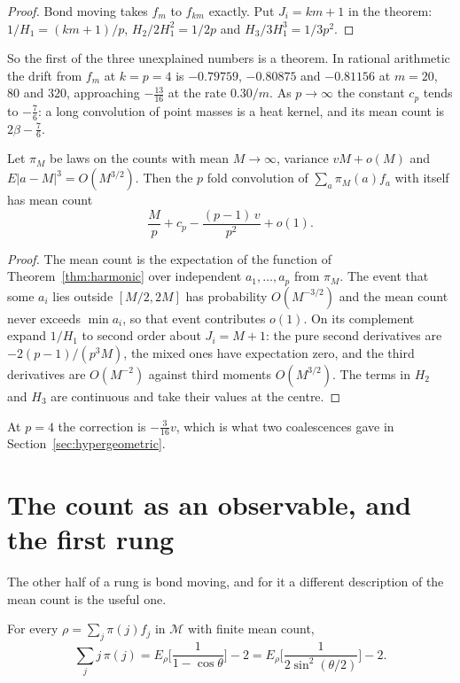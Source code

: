 \begin{proof}
Bond moving takes $f_m$ to $f_{km}$ exactly. Put $J_i=km+1$ in the theorem: $1/H_1=(km+1)/p$, $H_2/2H_1^2=1/2p$ and $H_3/3H_1^3=1/3p^2$.
\end{proof}

So the first of the three unexplained numbers is a theorem. In rational arithmetic the drift from $f_m$ at $k=p=4$ is $-0.79759$, $-0.80875$ and $-0.81156$ at $m=20$, $80$ and $320$, approaching $-\frac{13}{16}$ at the rate $0.30/m$. As $p\to\infty$ the constant $c_p$ tends to $-\frac76$: a long convolution of point masses is a heat kernel, and its mean count is $2\beta-\frac76$.

\begin{corollary}\label{cor:decdrift}
Let $\pi_M$ be laws on the counts with mean $M\to\infty$, variance $vM+o(M)$ and $E|a-M|^3=O(M^{3/2})$. Then the $p$ fold convolution of $\sum_a\pi_M(a)f_a$ with itself has mean count
\[
\frac Mp+c_p-\frac{(p-1)\,v}{p^2}+o(1).
\]
\end{corollary}

\begin{proof}
The mean count is the expectation of the function of Theorem~\ref{thm:harmonic} over independent $a_1,\dots,a_p$ from $\pi_M$. The event that some $a_i$ lies outside $[M/2,2M]$ has probability $O(M^{-3/2})$ and the mean count never exceeds $\min a_i$, so that event contributes $o(1)$. On its complement expand $1/H_1$ to second order about $J_i=M+1$: the pure second derivatives are $-2(p-1)/(p^3M)$, the mixed ones have expectation zero, and the third derivatives are $O(M^{-2})$ against third moments $O(M^{3/2})$. The terms in $H_2$ and $H_3$ are continuous and take their values at the centre.
\end{proof}

At $p=4$ the correction is $-\frac3{16}v$, which is what two coalescences gave in Section~\ref{sec:hypergeometric}.

\section{The count as an observable, and the first rung}\label{sec:observable}

The other half of a rung is bond moving, and for it a different description of the mean count is the useful one.

\begin{proposition}\label{prop:observable}
For every $\rho=\sum_j\pi(j)f_j$ in $\mathcal M$ with finite mean count,
\[
\sum_jj\,\pi(j)=E_\rho\Big[\frac{1}{1-\cos\theta}\Big]-2=E_\rho\Big[\frac1{2\sin^2(\theta/2)}\Big]-2 .
\]
\end{proposition}

